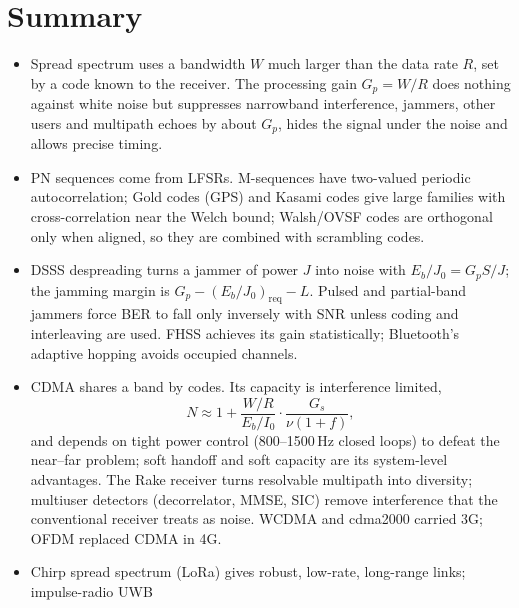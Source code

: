 \section{Summary}


\begin{itemize}
\item Spread spectrum uses a bandwidth $W$ much larger than the data rate $R$, set by a code
known to the receiver. The processing gain $G_p=W/R$ does nothing against white noise but
suppresses narrowband interference, jammers, other users and multipath echoes by about $G_p$,
hides the signal under the noise and allows precise timing.
\item PN sequences come from LFSRs. M-sequences have two-valued periodic autocorrelation; Gold
codes (GPS) and Kasami codes give large families with cross-correlation near the Welch bound;
Walsh/OVSF codes are orthogonal only when aligned, so they are combined with scrambling codes.
\item DSSS despreading turns a jammer of power $J$ into noise with $E_b/J_0=G_pS/J$; the jamming
margin is $G_p-(E_b/J_0)_{\text{req}}-L$. Pulsed and partial-band jammers force BER to fall only
inversely with SNR unless coding and interleaving are used. FHSS achieves its gain
statistically; Bluetooth's adaptive hopping avoids occupied channels.
\item CDMA shares a band by codes. Its capacity is interference limited,
\[N\approx1+\frac{W/R}{E_b/I_0}\cdot\frac{G_s}{\nu(1+f)},\]
and depends on tight power control
(800--1500\,Hz closed loops) to defeat the near--far problem; soft handoff and soft capacity are
its system-level advantages. The Rake receiver turns resolvable multipath into diversity;
multiuser detectors (decorrelator, MMSE, SIC) remove interference that the conventional
receiver treats as noise. WCDMA and cdma2000 carried 3G; OFDM replaced CDMA in 4G.
\item Chirp spread spectrum (LoRa) gives robust, low-rate, long-range links; impulse-radio UWB

\end{itemize}

